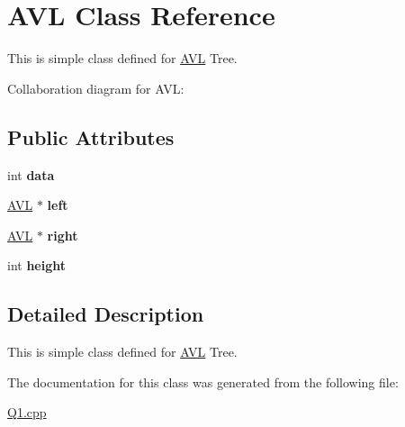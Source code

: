 \hypertarget{classAVL}{}\section{A\+VL Class Reference}
\label{classAVL}


This is simple class defined for \hyperlink{classAVL}{A\+VL} Tree.  




Collaboration diagram for A\+VL\+:
\subsection*{Public Attributes}
\begin{DoxyCompactItemize}
\item 
\mbox{\label{classAVL_afa399a68fc82696a9147b395ac33d1fa}} 
int {\bfseries data}
\item 
\mbox{\label{classAVL_ad57f3e5598a6dca42c0c0d6ccb836652}} 
\hyperlink{classAVL}{A\+VL} $\ast$ {\bfseries left}
\item 
\mbox{\label{classAVL_aee6f09e83a289de73ccefade92bf4401}} 
\hyperlink{classAVL}{A\+VL} $\ast$ {\bfseries right}
\item 
\mbox{\label{classAVL_ac154b727a5857acd56bd2d35ccc0446a}} 
int {\bfseries height}
\end{DoxyCompactItemize}


\subsection{Detailed Description}
This is simple class defined for \hyperlink{classAVL}{A\+VL} Tree. 

The documentation for this class was generated from the following file\+:\begin{DoxyCompactItemize}
\item 
\hyperlink{Q1_8cpp}{Q1.\+cpp}\end{DoxyCompactItemize}
